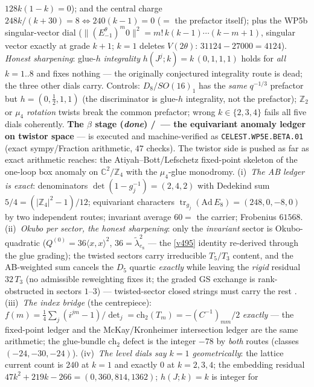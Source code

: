 \documentclass[11pt,a4paper]{article}
\newcommand{\Z}{\mathbb Z}
\begin{document}
\begin{itemize}
\begin{itemize}
$128k(1{-}k)=0$); and the central charge $248k/(k{+}30)=8\Leftrightarrow240(k{-}1)=0$ ($=$ the
prefactor itself); plus the WP5b singular-vector dial ($\|(E^\theta_{-1})^m0\|^2=m!\,k(k{-}1)\cdots
(k{-}m{+}1)$, singular vector exactly at grade $k{+}1$; $k=1$ deletes $V(2\theta)$:
$31124-27000=4124$). \emph{Honest sharpening}: glue-$h$ \emph{integrality} $h(J^j;k)=k\,(0,1,1,1)$
holds for \emph{all} $k=1..8$ and fixes nothing --- the originally conjectured integrality route is
dead; the three other dials carry. Controls: $D_8/SO(16)_1$ has the \emph{same} $q^{-1/3}$ prefactor
but $h=(0,\tfrac12,1,1)$ (the discriminator is glue-$h$ integrality, not the prefactor); $\Z_2$ or
$\mu_4$ \emph{rotation} twists break the common prefactor; wrong $k\in\{2,3,4\}$ fails all five
dials coherently. \textbf{The $\beta$ stage (\emph{done}) \mE/\mC\ --- the equivariant anomaly
ledger on twistor space} --- is executed and machine-verified as \texttt{CELEST.WP5E.BETA.01}
 (exact sympy/Fraction arithmetic, $47$
checks). The twistor side is pushed as far as exact arithmetic reaches: the Atiyah--Bott/Lefschetz
fixed-point skeleton of the one-loop box anomaly on $\mathbb C^2/\Z_4$ with the $\mu_4$-glue
monodromy. (i)~\emph{The AB ledger is exact}: denominators $\det(1-g_j^{-1})=(2,4,2)$ with Dedekind
sum $5/4=(|\Z_4|^2{-}1)/12$; equivariant characters $\operatorname{tr}_{g_j}(\mathrm{Ad}\,E_8)
=(248,0,-8,0)$ by two independent routes; invariant average $60=$ the carrier; Frobenius $61568$.
(ii)~\emph{Okubo per sector, the honest sharpening}: only the \emph{invariant} sector is
Okubo-quadratic ($Q^{(0)}=36\langle x,x\rangle^2$, $36=\tilde\lambda^2_{e_8}$ --- the \vref{v495}
identity re-derived through the glue grading); the twisted sectors carry irreducible $T_5/T_3$
content, and the AB-weighted sum cancels the $D_5$ quartic \emph{exactly} while leaving the
\emph{rigid} residual $32\,T_3$ (no admissible reweighting fixes it; the graded GS exchange is
rank-obstructed in sectors $1$--$3$) --- twisted-sector closed strings must carry the rest \mO.
(iii)~\emph{The index bridge} (the centrepiece): $f(m)=\tfrac14\sum_j(i^{jm}{-}1)/\det_j
=\mathrm{ch}_2(T_m)=-(C^{-1})_{mm}/2$ \emph{exactly} --- the fixed-point ledger and the
McKay/Kronheimer intersection ledger are the same arithmetic; the glue-bundle $\mathrm{ch}_2$
defect is the integer $-78$ by \emph{both} routes (classes $(-24,-30,-24)$). (iv)~\emph{The level
dials say $k=1$ geometrically}: the lattice current count is $240$ at $k{=}1$ and exactly $0$ at
$k=2,3,4$; the embedding residual $47k^2{+}219k{-}266=(0,360,814,1362)$; $h(J;k)=k$ is integer for

\end{itemize}
\end{itemize}
\end{document}
